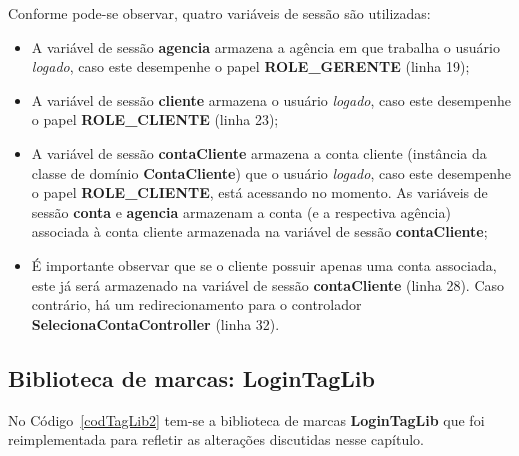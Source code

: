 \newpage

Conforme pode-se observar, quatro variáveis de sessão são utilizadas: 

\vspace{0.2cm}

\begin{itemize}

\item A  variável de sessão {\bf agencia}  armazena a agência em  que trabalha o
  usuário {\it logado}, caso este  desempenhe o papel {\bf ROLE\_GERENTE} (linha
  19); 

\vspace{0.2cm}

\item A variável  de sessão {\bf cliente} armazena o  usuário {\it logado}, caso
  este desempenhe o papel {\bf ROLE\_CLIENTE} (linha 23); 

\vspace{0.2cm}

\item  A  variável  de  sessão  {\bf  contaCliente}  armazena  a  conta  cliente
  (instância  da  classe de  domínio  {\bf  ContaCliente})  que o  usuário  {\it
  logado}, caso este  desempenhe o papel {\bf ROLE\_CLIENTE},  está acessando no
  momento.  As variáveis de sessão {\bf conta} e {\bf agencia} armazenam a conta
  (e a respectiva  agência) associada à conta cliente  armazenada na variável de
  sessão {\bf contaCliente};

\vspace{0.2cm}

\item É importante observar que se o cliente possuir apenas uma conta associada,
  este já será  armazenado na variável de sessão  {\bf contaCliente} (linha 28).
  Caso   contrário,   há   um   redirecionamento   para   o   controlador   {\bf
    SelecionaContaController} (linha 32).  

\end{itemize}

\subsection{Biblioteca de marcas: LoginTagLib}

\vspace{0.2cm}

No Código~\ref{codTagLib2}  tem-se a biblioteca de marcas  {\bf LoginTagLib} que
foi reimplementada para refletir as alterações discutidas nesse capítulo.  


